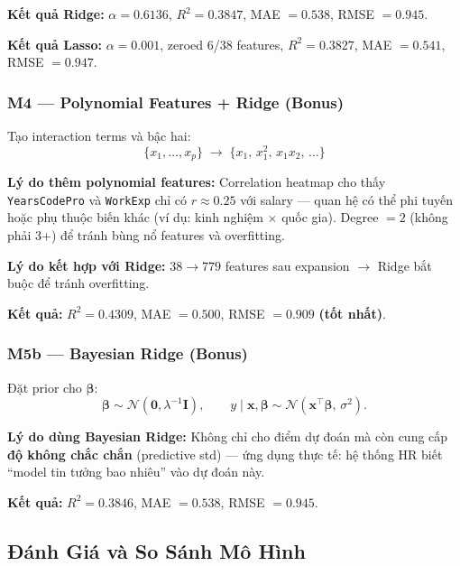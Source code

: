 \noindent\textbf{Kết quả Ridge:} $\alpha = 0.6136$,
$R^2 = 0.3847$, MAE $= 0.538$, RMSE $= 0.945$.

\noindent\textbf{Kết quả Lasso:} $\alpha = 0.001$, zeroed 6/38 features,
$R^2 = 0.3827$, MAE $= 0.541$, RMSE $= 0.947$.

\subsubsection{M4 — Polynomial Features + Ridge (Bonus)}

Tạo interaction terms và bậc hai:
\[
    \{x_1, \ldots, x_p\} \;\longrightarrow\;
    \{x_1,\, x_1^2,\, x_1 x_2,\, \ldots\}
\]

\noindent\textbf{Lý do thêm polynomial features:} Correlation heatmap cho thấy
\texttt{YearsCodePro} và \texttt{WorkExp} chỉ có $r \approx 0.25$ với salary — quan hệ
có thể phi tuyến hoặc phụ thuộc biến khác (ví dụ: kinh nghiệm $\times$ quốc gia).
Degree $= 2$ (không phải 3+) để tránh bùng nổ features và overfitting.

\noindent\textbf{Lý do kết hợp với Ridge:} $38 \to 779$ features sau expansion
$\to$ Ridge bắt buộc để tránh overfitting.

\noindent\textbf{Kết quả:} $R^2 = 0.4309$, MAE $= 0.500$, RMSE $= 0.909$
\textbf{(tốt nhất)}.

\subsubsection{M5b — Bayesian Ridge (Bonus)}

Đặt prior cho $\boldsymbol{\beta}$:
\begin{equation}
    \boldsymbol{\beta} \sim \mathcal{N}(\mathbf{0}, \lambda^{-1}\mathbf{I}),
    \qquad
    y \mid \mathbf{x}, \boldsymbol{\beta} \sim \mathcal{N}(\mathbf{x}^\top\boldsymbol{\beta},\, \sigma^2).
\end{equation}

\noindent\textbf{Lý do dùng Bayesian Ridge:} Không chỉ cho điểm dự đoán mà còn cung cấp
\textbf{độ không chắc chắn} (predictive std) — ứng dụng thực tế: hệ thống HR biết
``model tin tưởng bao nhiêu'' vào dự đoán này.

\noindent\textbf{Kết quả:} $R^2 = 0.3846$, MAE $= 0.538$, RMSE $= 0.945$.

\subsection{Đánh Giá và So Sánh Mô Hình}

